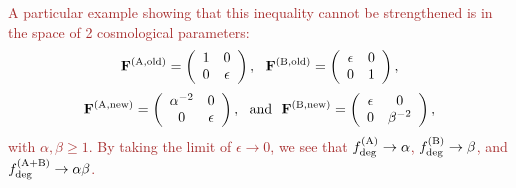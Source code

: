 \documentclass[usenatbib]{mnras}
\newcommand{\changetext}[1]{\textcolor{brown}{#1}}
\begin{document}
\changetext{A particular example showing that this inequality cannot be strengthened is in the space of 2 cosmological parameters:
\begin{equation}
{\bf F}^{\rm(A,old)} = \left( \begin{array}{cc} 1 & 0 \\ 0 & \epsilon \end{array} \right),
~~
{\bf F}^{\rm(B,old)} = \left( \begin{array}{cc} \epsilon & 0 \\ 0 & 1 \end{array} \right),
\nonumber
\end{equation}
\begin{equation}
{\bf F}^{\rm(A,new)} = \left( \begin{array}{cc} \alpha^{-2} & 0 \\ 0 & \epsilon \end{array} \right),
~~{\rm and}~~
{\bf F}^{\rm(B,new)} = \left( \begin{array}{cc} \epsilon & 0 \\ 0 & \beta^{-2} \end{array} \right),
\end{equation}
with $\alpha,\beta\ge 1$. By taking the limit of $\epsilon\rightarrow 0$, we see that $f_{\rm deg}^{\rm(A)}\rightarrow\alpha$, $f_{\rm deg}^{\rm(B)}\rightarrow\beta$, and $f_{\rm deg}^{\rm(A+B)}\rightarrow \alpha\beta$.
}

\bsp	
\label{lastpage}
\end{document}
